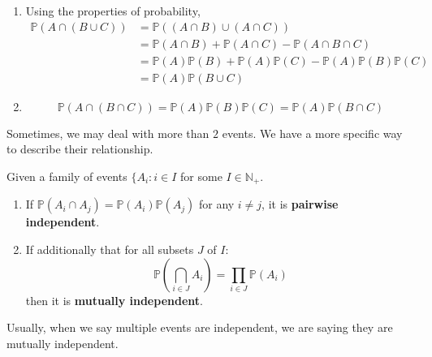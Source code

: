 \documentclass{huhtakm-template-book}
\newcommand{\prob}{\mathbb{P}}
\begin{document}
\begin{proofing}
	\begin{enumerate}
		\item Using the properties of probability,
		\begin{align*}
			\prob(A\cap(B\cup C))&=\prob((A\cap B)\cup(A\cap C))\\
			&=\prob(A\cap B)+\prob(A\cap C)-\prob(A\cap B\cap C)\\
			&=\prob(A)\prob(B)+\prob(A)\prob(C)-\prob(A)\prob(B)\prob(C)\\
			&=\prob(A)\prob(B\cup C)
		\end{align*}
		\item
		\begin{equation*}
			\prob(A\cap(B\cap C))=\prob(A)\prob(B)\prob(C)=\prob(A)\prob(B\cap C)
		\end{equation*}
	\end{enumerate}
\end{proofing}
Sometimes, we may deal with more than $2$ events. We have a more specific way to describe their relationship.
\begin{defn}
	Given a family of events $\{A_{i}:i\in I$ for some $I\in\mathbb{N}_{+}$.
	\begin{enumerate}
		\item If $\prob(A_{i}\cap A_{j})=\prob(A_{i})\prob(A_{j})$ for any $i\neq j$, it is \textbf{pairwise independent}.
		\item If additionally that for all subsets $J$ of $I$:
		\begin{equation*}
			\prob\left(\bigcap_{i\in J}A_{i}\right)=\prod_{i\in J}\prob(A_{i})
		\end{equation*}
		then it is \textbf{mutually independent}.
	\end{enumerate}
\end{defn}
\begin{rem}
	Usually, when we say multiple events are independent, we are saying they are mutually independent.
\end{rem}
\end{document}
